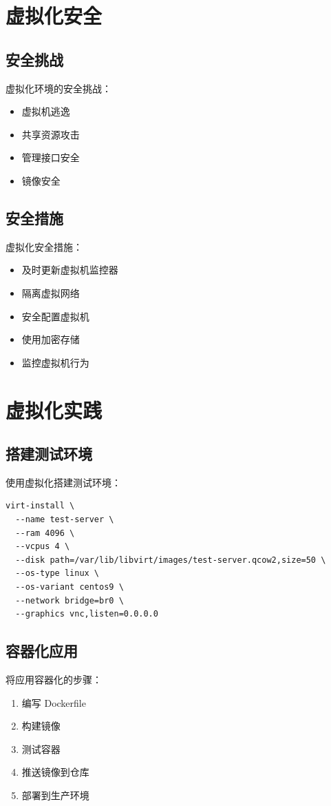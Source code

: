 \documentclass[12pt,UTF8]{ctexbook}
\begin{document}
\chapter{虚拟化安全}
\label{chap:virtualization_security}

\section{安全挑战}
\label{sec:security_challenges}

虚拟化环境的安全挑战：
\begin{itemize}
    \item 虚拟机逃逸
    \item 共享资源攻击
    \item 管理接口安全
    \item 镜像安全
\end{itemize}

\section{安全措施}
\label{sec:security_measures}

虚拟化安全措施：
\begin{itemize}
    \item 及时更新虚拟机监控器
    \item 隔离虚拟网络
    \item 安全配置虚拟机
    \item 使用加密存储
    \item 监控虚拟机行为
\end{itemize}

\chapter{虚拟化实践}
\label{chap:practice}

\section{搭建测试环境}
\label{sec:test_environment}

使用虚拟化搭建测试环境：
\begin{verbatim}
virt-install \
  --name test-server \
  --ram 4096 \
  --vcpus 4 \
  --disk path=/var/lib/libvirt/images/test-server.qcow2,size=50 \
  --os-type linux \
  --os-variant centos9 \
  --network bridge=br0 \
  --graphics vnc,listen=0.0.0.0
\end{verbatim}

\section{容器化应用}
\label{sec:containerize_app}

将应用容器化的步骤：
\begin{enumerate}
    \item 编写 Dockerfile
    \item 构建镜像
    \item 测试容器
    \item 推送镜像到仓库
    \item 部署到生产环境
\end{enumerate}

\backmatter
\end{document}

